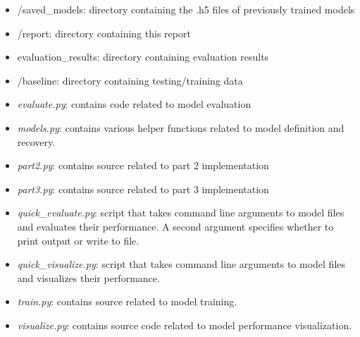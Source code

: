 \documentclass{article}
\begin{document}
\begin{itemize}
	\item /saved\_models: directory containing the .h5 files of previously trained models
	\item /report: directory containing this report
	\item evaluation\_results: directory containing evaluation results
	\item /baseline: directory containing testing/training data
	\item \emph{evaluate.py}: contains code related to model evaluation
	\item \emph{models.py}: contains various helper functions related to model definition and recovery.
	\item \emph{part2.py}: contains source related to part 2 implementation
	\item \emph{part3.py}: contains source related to part 3 implementation
	\item \emph{quick\_evaluate.py}: script that takes command line arguments to model files and evaluates their performance. A second argument specifies whether to print output or write to file.
	\item \emph{quick\_visualize.py}: script that takes command line arguments to model files and visualizes their performance.
	\item \emph{train.py}: contains source related to model training.
	\item \emph{visualize.py}: contains source code related to model performance visualization.
\end{itemize}
\end{document}
